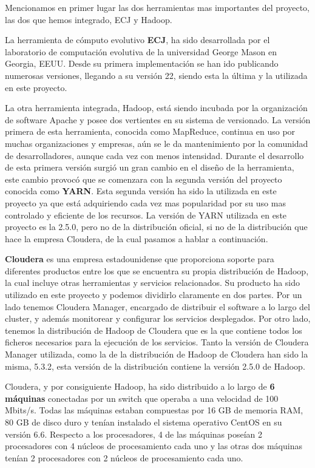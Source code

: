 Mencionamos en primer lugar las dos herramientas mas importantes del proyecto, las dos que hemos integrado, ECJ y Hadoop.

La herramienta de c\'omputo evolutivo \textbf{ECJ}, ha sido desarrollada por el laboratorio de computaci\'on evolutiva de la universidad George Mason en Georgia, EEUU. Desde su primera implementaci\'on se han ido publicando numerosas versiones, llegando a su versi\'on 22, siendo esta la \'ultima y la utilizada en este proyecto.

La otra herramienta integrada, Hadoop, est\'a siendo incubada por la organizaci\'on de software Apache y posee dos vertientes en su sistema de versionado. La versi\'on primera de esta herramienta, conocida como MapReduce, continua en uso por muchas organizaciones y empresas, a\'un se le da mantenimiento por la comunidad de desarrolladores, aunque cada vez con menos intensidad. Durante el desarrollo de esta primera versi\'on surgió un gran cambio en el dise\~no de la herramienta, este cambio provoc\'o que se comenzara con la segunda versi\'on del proyecto conocida como \textbf{YARN}. Esta segunda versi\'on ha sido la utilizada en este proyecto ya que est\'a adquiriendo cada vez mas popularidad por su uso mas controlado y eficiente de los recursos. La versi\'on de YARN utilizada en este proyecto es la 2.5.0, pero no de la distribuci\'on oficial, si no de la distribuci\'on que hace la empresa Cloudera, de la cual pasamos a hablar a continuaci\'on.

\textbf{Cloudera} es una empresa estadounidense que proporciona soporte para diferentes productos entre los que se encuentra su propia distribuci\'on de Hadoop, la cual incluye otras herramientas y servicios relacionados. Su producto ha sido utilizado en este proyecto y podemos dividirlo claramente en dos partes. Por un lado tenemos Cloudera Manager, encargado de distribuir el software a lo largo del cluster, y adem\'as monitorear y configurar los servicios desplegados. Por otro lado, tenemos la distribuci\'on de Hadoop de Cloudera que es la que contiene todos los ficheros necesarios para la ejecuci\'on de los servicios. Tanto la versi\'on de Cloudera Manager utilizada, como la de la distribuci\'on de Hadoop de Cloudera han sido la misma, 5.3.2, esta versi\'on de la distribuci\'on contiene la versi\'on 2.5.0 de Hadoop.

Cloudera, y por consiguiente Hadoop, ha sido distribuido a lo largo de \textbf{6 m\'aquinas} conectadas por un switch que operaba a una velocidad de 100 Mbits/s. Todas las m\'aquinas estaban compuestas por 16 GB de memoria RAM, 80 GB de disco duro y tenían instalado el sistema operativo CentOS en su versi\'on 6.6. Respecto a los procesadores, 4 de las m\'aquinas poseían 2 procesadores con 4 n\'ucleos de procesamiento cada uno y las otras dos m\'aquinas tenían 2 procesadores con 2 n\'ucleos de procesamiento cada uno.

